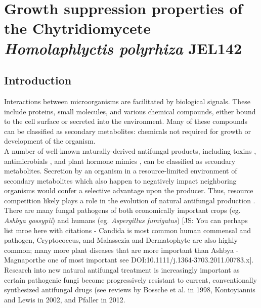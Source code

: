 ﻿%
\chapter{Growth suppression properties of the Chytridiomycete \textit{Homolaphlyctis polyrhiza} JEL142}
\label{chap:HpInhibition}
\section{Introduction}
Interactions between microorganisms are facilitated by biological signals. These include proteins, small molecules, and various chemical compounds, either bound to the cell surface or secreted into the environment. Many of these compounds can be classified as secondary metabolites: chemicals not required for growth or development of the organism. \\
\indent A number of well-known naturally-derived antifungal products, including toxins \cite{Kokkonen2010}, antimicrobials \cite{Wiemann2014}, and plant hormone mimics \cite{Howlett2006}, can be classified as secondary metabolites. Secretion by an organism in a resource-limited environment of secondary metabolites which also happen to negatively impact neighboring organisms would confer a selective advantage upon the producer. Thus, resource competition likely plays a role in the evolution of natural antifungal production \cite{Vicente2003}.\\
\indent There are many fungal pathogens of both economically important crops (eg. \textit{Ashbya gossypii}) and humans (eg. \textit{Aspergillus fumigatus}) [JS: You can perhaps list mroe here with citations - Candida is most common human commensal and pathogen, Cryptococcus, and Malassezia and Dermatophyte are also highly common; many more plant diseases that are more important than Ashbya - Magnaporthe one of most important see DOI:10.1111/j.1364-3703.2011.00783.x]. Research into new natural antifungal treatment is increasingly important as certain pathogenic fungi become progressively resistant to current, conventionally synthesized antifungal drugs (see reviews by Bossche et al. in 1998\nocite{Bossche1998}, Kontoyiannis and Lewis in 2002\nocite{Kontoyiannis2002}, and Pfaller in 2012\nocite{Pfaller2012}. \\

